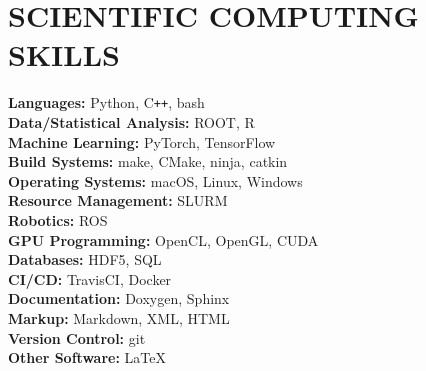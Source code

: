 \section{\small{SCIENTIFIC COMPUTING \\ SKILLS}}

\textbf{Languages:} \hfill Python, C\verb!++!, bash\\
\textbf{Data/Statistical Analysis:} \hfill ROOT, R\\
\textbf{Machine Learning:} \hfill PyTorch, TensorFlow\\
\textbf{Build Systems:} \hfill make, CMake, ninja, catkin\\
\textbf{Operating Systems:} \hfill macOS, Linux, Windows\\
\textbf{Resource Management:} \hfill SLURM\\
\textbf{Robotics:} \hfill ROS\\
\textbf{GPU Programming:} \hfill OpenCL, OpenGL, CUDA\\
\textbf{Databases:} \hfill HDF5, SQL\\
\textbf{CI/CD:} \hfill TravisCI, Docker\\
\textbf{Documentation:} \hfill Doxygen, Sphinx\\
\textbf{Markup:} \hfill Markdown, XML, HTML\\
\textbf{Version Control:} \hfill git\\
\textbf{Other Software:} \hfill \LaTeX %

%
